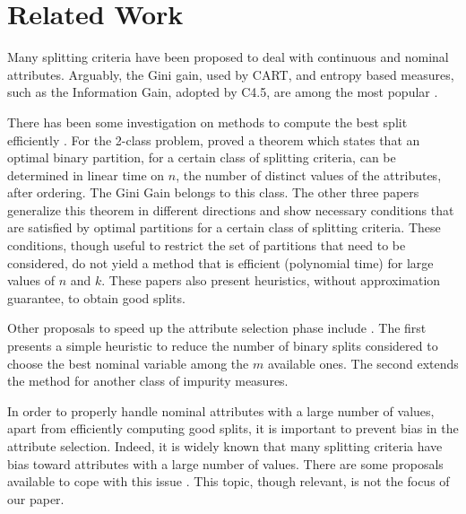 \newpage

\chapter{Related Work}
\label{chap:relatedwork}

Many splitting criteria have been proposed to 
deal with continuous and nominal attributes.
Arguably, the Gini gain, used by CART,  and entropy based measures, such  as 
the Information Gain, adopted by C4.5, are among
the most popular \cite{books/sp/datamining2005/RokachM05,
Loh2014,series/sbcs/BarrosCF15}.

There has been  some investigation on 
methods to compute the best split efficiently 
\cite{Breiman84,Chou:91,BPKN:92,journals/datamine/CoppersmithHH99}.
For the 2-class problem,  \cite{Breiman84} proved a theorem which states that an optimal
binary partition, for a certain class of splitting criteria,
can be determined in linear time on $n$, the number of distinct values of the attributes, after ordering.
The Gini  Gain belongs to this class.
The  other  three papers generalize
this theorem  in different directions 
and show necessary conditions that are satisfied by optimal partitions for a certain class of splitting criteria. 
These conditions, though useful to restrict the set of partitions
that need to be considered, do not yield  a method that
is efficient (polynomial time) for large values of $n$ and $k$.  These papers also  present  heuristics, without approximation guarantee, to obtain good splits.

Other proposals to  speed up the attribute selection phase
 include  \cite{MolaSiciliano1997,Shih2001}. 
The first presents a simple  heuristic
to reduce the number of binary splits considered to
choose the best nominal variable among the $m$ available ones.
 The second   extends the method for another class
of impurity measures.

In order to properly
handle nominal attributes with a large number of values,
apart from efficiently computing good splits, it is
important to prevent bias in the attribute selection.
Indeed, it is widely  known that many splitting criteria have bias toward
attributes with a large number of values. There are some  proposals available
to cope with this issue 
\cite{conf/icml/DobraG01,Shih2004,Hothorn:2006:URP}. 
This topic, though relevant, is not the focus of our paper.